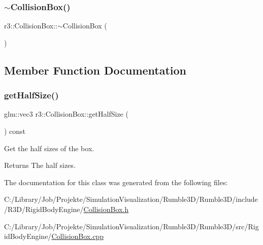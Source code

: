 \subsubsection{\texorpdfstring{$\sim$\+Collision\+Box()}{~CollisionBox()}}
{\footnotesize\ttfamily r3\+::\+Collision\+Box\+::$\sim$\+Collision\+Box (\begin{DoxyParamCaption}{ }\end{DoxyParamCaption})\hspace{0.3cm}{\ttfamily [default]}}



\subsection{Member Function Documentation}
\mbox{\label{classr3_1_1_collision_box_a6d35bfc27fd291409cb5e90ae2464179}} 
\subsubsection{\texorpdfstring{get\+Half\+Size()}{getHalfSize()}}
{\footnotesize\ttfamily glm\+::vec3 r3\+::\+Collision\+Box\+::get\+Half\+Size (\begin{DoxyParamCaption}{ }\end{DoxyParamCaption}) const}



Get the half sizes of the box. 

\begin{DoxyReturn}{Returns}
The half sizes. 
\end{DoxyReturn}


The documentation for this class was generated from the following files\+:\begin{DoxyCompactItemize}
\item 
C\+:/\+Library/\+Job/\+Projekte/\+Simulation\+Visualization/\+Rumble3\+D/\+Rumble3\+D/include/\+R3\+D/\+Rigid\+Body\+Engine/\mbox{\hyperlink{_collision_box_8h}{Collision\+Box.\+h}}\item 
C\+:/\+Library/\+Job/\+Projekte/\+Simulation\+Visualization/\+Rumble3\+D/\+Rumble3\+D/src/\+Rigid\+Body\+Engine/\mbox{\hyperlink{_collision_box_8cpp}{Collision\+Box.\+cpp}}\end{DoxyCompactItemize}
